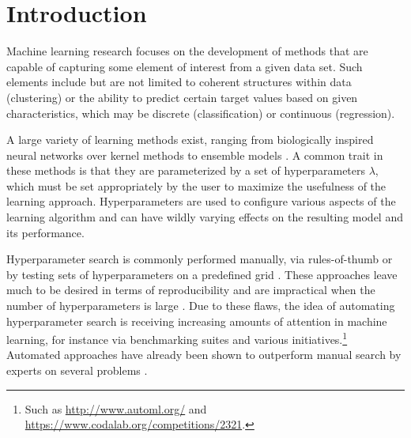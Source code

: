

\section{Introduction}
Machine learning research focuses on the development of methods that are capable of capturing some element of interest from a given data set. Such elements include but are not limited to coherent structures within data (clustering) or the ability to predict certain target values based on given characteristics, which may be discrete (classification) or continuous (regression). %

A large variety of learning methods exist, ranging from biologically inspired neural networks \citep{bishop1995neural} over kernel methods \citep{scholkopf2002learning} to ensemble models \citep{breiman2001random, JMLR:v15:claesen14a}. A common trait in these methods is that they are parameterized by a set of hyperparameters $\lambda$, which must be set appropriately by the user to maximize the usefulness of the learning approach. Hyperparameters are used to configure various aspects of the learning algorithm and can have wildly varying effects on the resulting model and its performance. 

Hyperparameter search is commonly performed manually, via rules-of-thumb \citep{hsu2003practical,hinton2012practical} or by testing sets of hyperparameters on a predefined grid \citep{pedregosa2011scikit}. These approaches leave much to be desired in terms of reproducibility and are impractical when the number of hyperparameters is large \citep{DBLP:journals/corr/ClaesenSPMM14}. Due to these flaws, the idea of automating hyperparameter search is receiving increasing amounts of attention in  machine learning, for instance via benchmarking suites \citep{eggensperger2013towards} and various initiatives.\footnote{Such as \url{http://www.automl.org/} and \url{https://www.codalab.org/competitions/2321}.} %
Automated approaches have already been shown to outperform manual search by experts on several problems \citep{ bergstra2011algorithms,bergstra2012random}. 

